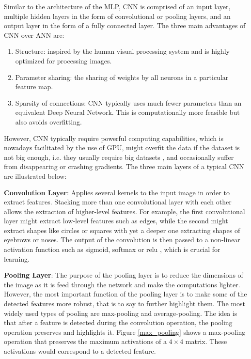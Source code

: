 \documentclass[extern,palatino]{cgMA}
\begin{document}
Similar to the architecture of the MLP, CNN is comprised of an input layer, multiple hidden layers in the form of convolutional or pooling layers, and an output layer in the form of a fully connected layer. The three main advantages of CNN over ANN are:
\begin{enumerate}
    \item Structure: inspired by the human visual processing system and is highly optimized for processing images.
    \item Parameter sharing: the sharing of weights by all neurons in a particular feature map.
    \item Sparsity of connections: CNN typically uses much fewer parameters than an equivalent Deep Neural Network. This is computationally more feasible but also avoids overfitting.
\end{enumerate}

However, CNN typically require powerful computing capabilities, which is nowadays facilitated by the use of GPU, might overfit the data if the dataset is not big enough, i.e. they usually require big datasets \cite{krizhevsky2012imagenet}, and occasionally suffer from disappearing or crashing gradients. The three main layers of a typical CNN are illustrated below:

\bigskip
\noindent\textbf{Convolution Layer}: Applies several kernels to the input image in order to extract features. Stacking more than one convolutional layer with each other allows the extraction of higher-level features. For example, the first convolutional layer might extract low-level features such as edges, while the second might extract shapes like circles or squares with yet a deeper one extracting shapes of eyebrows or noses. The output of the convolution is then passed to a non-linear activation function such as sigmoid, softmax or relu \cite{nwankpa2018activation}, which is crucial for learning.

\bigskip
\noindent\textbf{Pooling Layer}: The purpose of the pooling layer is to reduce the dimensions of the image as it is feed through the network and make the computations lighter. However, the most important function of the pooling layer is to make some of the detected features more robust, that is to say to further highlight them. The most widely used types of pooling are max-pooling and average-pooling. The idea is that after a feature is detected during the convolution operation, the pooling operation preserves and highlights it. Figure \ref{max_pooling} shows a max-pooling operation that preserves the maximum activations of a $4 \times 4$ matrix. These activations would correspond to a detected feature.
\end{document}

